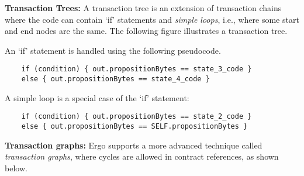 \documentclass[runningheads]{llncs}
\newcommand{\node}{\mathsf{t}}
\begin{document}
\textbf{Transaction Trees:} A transaction tree is an extension of transaction chains where the code can contain `if' statements and {\em simple loops}, i.e., where some start and end nodes are the same. The following figure illustrates a transaction tree.


An `if' statement is handled using the following pseudocode. 

\begin{verbatim}
    if (condition) { out.propositionBytes == state_3_code }
    else { out.propositionBytes == state_4_code }
\end{verbatim}

A simple loop is a special case of the `if' statement:
\begin{verbatim}
    if (condition) { out.propositionBytes == state_2_code }
    else { out.propositionBytes == SELF.propositionBytes }
\end{verbatim}


\textbf{Transaction graphs:} Ergo supports a more advanced technique called {\em transaction graphs}, where cycles are allowed in contract references, as shown below. %

\end{document}
